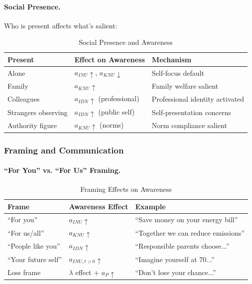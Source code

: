 \paragraph{Social Presence.}
Who is present affects what's salient:

\begin{table}[htbp]
\centering
\caption{Social Presence and Awareness}
\label{tab:social-presence}
\renewcommand{\arraystretch}{1.3}
\begin{tabular}{@{}lll@{}}
\toprule
\textbf{Present} & \textbf{Effect on Awareness} & \textbf{Mechanism} \\
\midrule
Alone & $a_{INU} \uparrow$, $a_{KNU} \downarrow$ & Self-focus default \\
Family & $a_{KNU} \uparrow$ & Family welfare salient \\
Colleagues & $a_{IDN} \uparrow$ (professional) & Professional identity activated \\
Strangers observing & $a_{IDN} \uparrow$ (public self) & Self-presentation concerns \\
Authority figure & $a_{KNU} \uparrow$ (norms) & Norm compliance salient \\
\bottomrule
\end{tabular}
\end{table}

\subsubsection{Framing and Communication}

\paragraph{``For You'' vs. ``For Us'' Framing.}

\begin{table}[htbp]
\centering
\caption{Framing Effects on Awareness}
\label{tab:framing-awareness}
\renewcommand{\arraystretch}{1.3}
\begin{tabular}{@{}lll@{}}
\toprule
\textbf{Frame} & \textbf{Awareness Effect} & \textbf{Example} \\
\midrule
``For you'' & $a_{INU} \uparrow$ & ``Save money on your energy bill'' \\
``For us/all'' & $a_{KNU} \uparrow$ & ``Together we can reduce emissions'' \\
``People like you'' & $a_{IDN} \uparrow$ & ``Responsible parents choose...'' \\
``Your future self'' & $a_{INU,t>0} \uparrow$ & ``Imagine yourself at 70...'' \\
Loss frame & $\lambda$ effect + $a_P \uparrow$ & ``Don't lose your chance...'' \\
\bottomrule
\end{tabular}
\end{table}

